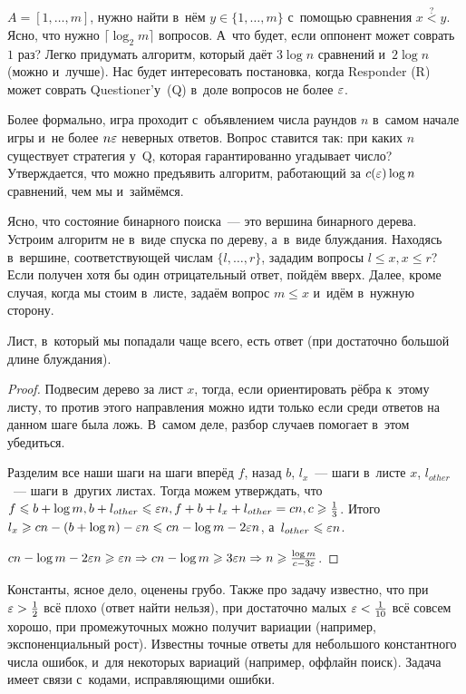 \documentclass{article}
\begin{document}
$A = [1, \ldots, m]$, нужно найти в~нём $y \in \{1, \ldots, m\}$ с~помощью
сравнения $x \overset{?}< y$. Ясно, что нужно $\lceil \log_2 m \rceil$ вопросов.
А~что будет, если оппонент может соврать $1$ раз? Легко придумать алгоритм,
который даёт $3 \log n$ сравнений и~$2 \log n$ (можно и~лучше). Нас будет
интересовать постановка, когда Responder (R) может соврать Questioner'у~(Q)
в~доле вопросов не более $\varepsilon$.

Более формально, игра проходит с~объявлением числа раундов $n$ в~самом начале
игры и~не более $n \varepsilon$ неверных ответов. Вопрос ставится так: при каких $n$
существует стратегия у~Q, которая гарантированно угадывает число? Утверждается,
что можно предъявить алгоритм, работающий за $c(\varepsilon) \log n$ сравнений, чем мы
и~займёмся.

Ясно, что состояние бинарного поиска~--- это вершина бинарного дерева. Устроим
алгоритм не в~виде спуска по дереву, а~в~виде блуждания. Находясь в~вершине,
соответствующей числам $\{l, \ldots, r\}$, зададим вопросы $l \le x, x \le r$?
Если получен хотя бы один отрицательный ответ, пойдём вверх. Далее, кроме
случая, когда мы стоим в~листе, задаём вопрос $m \le x$ и~идём в~нужную сторону.

\begin{claim}
	Лист, в~который мы попадали чаще всего, есть ответ (при достаточно большой
	длине блуждания).
\end{claim}
\begin{proof}
	Подвесим дерево за лист $x$, тогда, если ориентировать рёбра к~этому листу, то
	против этого направления можно идти только если среди ответов на данном шаге
	была ложь. В~самом деле, разбор случаев помогает в~этом убедиться.

	Разделим все наши шаги на шаги вперёд $f$, назад $b$, $l_x$~--- шаги в~листе
	$x$, $l_{other}$~--- шаги в~других листах. Тогда можем утверждать, что $f \leqslant
	b + \log m, b + l_{other} \leqslant \varepsilon n, f + b + l_x + l_{other} = cn, c \geqslant
	\frac{1}{3}$. Итого $l_x \geqslant cn - (b + \log n) - \varepsilon n \leqslant cn - \log m - 2
	\varepsilon n$, а~$l_{other} \leqslant \varepsilon n$.

	$cn - \log m - 2 \varepsilon n \geqslant \varepsilon n \Rightarrow cn - \log m \geqslant 3 \varepsilon n
	\Rightarrow n \geqslant \frac{\log m}{c - 3\varepsilon}$.
\end{proof}

Константы, ясное дело, оценены грубо. Также про задачу известно, что при $\varepsilon >
\frac{1}{2}$ всё плохо (ответ найти нельзя), при достаточно малых $\varepsilon <
\frac{1}{10}$ всё совсем хорошо, при промежуточных можно получит вариации
(например, экспоненциальный рост). Известны точные ответы для небольшого
константного числа ошибок, и~для некоторых вариаций (например, оффлайн поиск).
Задача имеет связи с~кодами, исправляющими ошибки.
\end{document}
